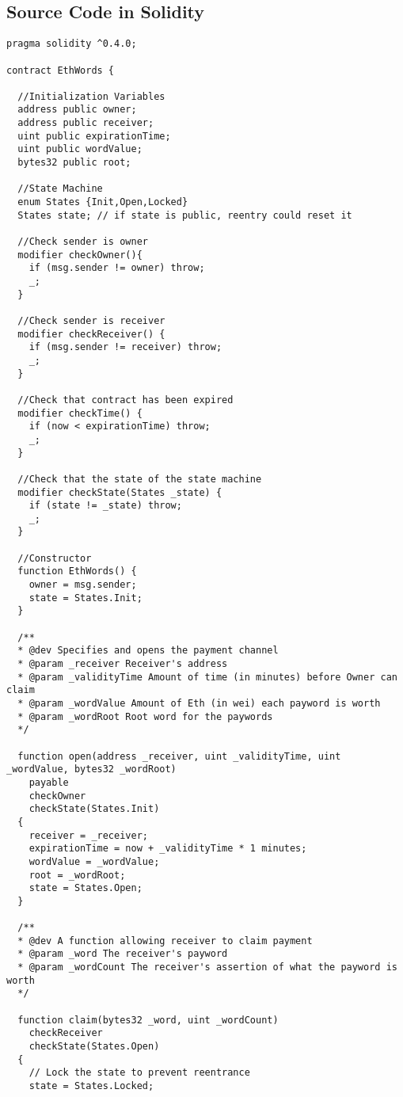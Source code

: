 
\subsection{\ew Source Code in Solidity}

\begin{lstlisting}[basicstyle=\scriptsize\ttfamily]
pragma solidity ^0.4.0;

contract EthWords {

  //Initialization Variables
  address public owner;
  address public receiver;
  uint public expirationTime;
  uint public wordValue;
  bytes32 public root;

  //State Machine
  enum States {Init,Open,Locked}
  States state; // if state is public, reentry could reset it

  //Check sender is owner
  modifier checkOwner(){
    if (msg.sender != owner) throw;
    _;
  }

  //Check sender is receiver
  modifier checkReceiver() {
    if (msg.sender != receiver) throw;
    _;
  }

  //Check that contract has been expired
  modifier checkTime() {
    if (now < expirationTime) throw;
    _;
  }

  //Check that the state of the state machine
  modifier checkState(States _state) {
    if (state != _state) throw;
    _;
  }

  //Constructor
  function EthWords() {
    owner = msg.sender;
    state = States.Init;
  }

  /**
  * @dev Specifies and opens the payment channel
  * @param _receiver Receiver's address
  * @param _validityTime Amount of time (in minutes) before Owner can claim
  * @param _wordValue Amount of Eth (in wei) each payword is worth
  * @param _wordRoot Root word for the paywords
  */

  function open(address _receiver, uint _validityTime, uint _wordValue, bytes32 _wordRoot)
    payable
    checkOwner
    checkState(States.Init)
  {
    receiver = _receiver;
    expirationTime = now + _validityTime * 1 minutes;
    wordValue = _wordValue;
    root = _wordRoot;
    state = States.Open;
  }
  
  /**
  * @dev A function allowing receiver to claim payment
  * @param _word The receiver's payword
  * @param _wordCount The receiver's assertion of what the payword is worth
  */

  function claim(bytes32 _word, uint _wordCount)
    checkReceiver
    checkState(States.Open)
  {
    // Lock the state to prevent reentrance
    state = States.Locked;


\end{lstlisting}
